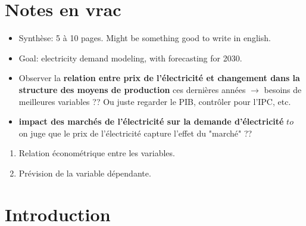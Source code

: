 \section{Notes en vrac}
\begin{itemize}
    \item Synthèse: 5 à 10 pages. Might be something good to write in english.
    \item Goal: electricity demand modeling, with forecasting for 2030. 
    \item Observer la \textbf{relation entre prix de l'électricité et changement dans la structure des moyens de production} ces dernières années $\to$ besoins de meilleures variables ?? Ou juste regarder le PIB, contrôler pour l'IPC, etc.
    \item \textbf{impact des marchés de l'électricité sur la demande d'électricité} $to$ on juge que le prix de l'électricité capture l'effet du "marché" ??
\end{itemize}


\begin{enumerate}
    \item Relation économétrique entre les variables. 
    \item Prévision de la variable dépendante.
\end{enumerate}

\section{Introduction}
